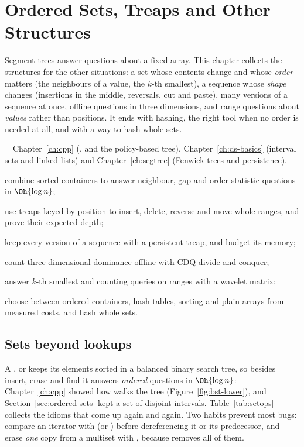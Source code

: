 \chapter{Ordered Sets, Treaps and Other Structures}\label{ch:advds}

Segment trees answer questions about a fixed array. This chapter collects the structures for the other situations: a set whose
contents change and whose \emph{order} matters (the neighbours of a value, the $k$-th smallest), a sequence whose \emph{shape} changes
(insertions in the middle, reversals, cut and paste), many versions of a sequence at once, offline questions in three dimensions, and
range questions about \emph{values} rather than positions. It ends with hashing, the right tool when no order is needed at all, and
with a way to hash whole sets.

\begin{chapterintro}{\gold\ \plat\ \ioi}{Chapter~\ref{ch:cpp} (,  and the policy-based tree),
Chapter~\ref{ch:ds-basics} (interval sets and linked lists) and Chapter~\ref{ch:segtree} (Fenwick trees and persistence).}
  \item combine sorted containers to answer neighbour, gap and order-statistic questions in $\Oh{\log n}$;
  \item use treaps keyed by position to insert, delete, reverse and move whole ranges, and prove their expected depth;
  \item keep every version of a sequence with a persistent treap, and budget its memory;
  \item count three-dimensional dominance offline with CDQ divide and conquer;
  \item answer $k$-th smallest and counting queries on ranges with a wavelet matrix;
  \item choose between ordered containers, hash tables, sorting and plain arrays from measured costs, and hash whole sets.
\end{chapterintro}

\section[Sets beyond lookups]{Sets beyond lookups \hfill \gold}\label{sec:setsorder}

A ,  or  keeps its elements sorted in a balanced binary search tree, so besides insert, erase and
find it answers \emph{ordered} questions in $\Oh{\log n}$: Chapter~\ref{ch:cpp} showed how  walks the tree
(Figure~\ref{fig:bst-lower}), and Section~\ref{sec:ordered-sets} kept a set of disjoint intervals. Table~\ref{tab:setops} collects
the idioms that come up again and again. Two habits prevent most bugs: compare an iterator with  (or ) before
dereferencing it or its predecessor, and erase \emph{one} copy from a multiset with , because
 removes all of them.

